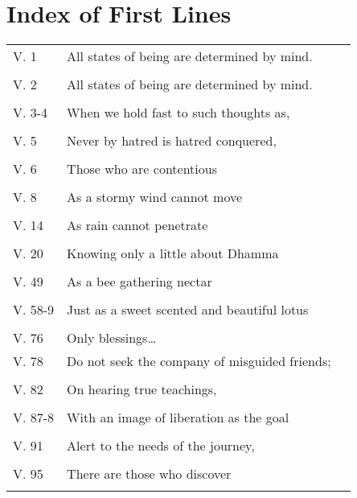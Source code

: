 
\chapter{Index of First Lines}

{\smaller
\setlength{\parskip}{0pt}
\setlength{\parindent}{0pt}

\begin{longtable}[c]{llr}
V. 1 & All states of being are determined by mind.\\ & \pageref{dhp-1}\\
V. 2 & All states of being are determined by mind.\\ & \pageref{dhp-2}\\
V. 3-4 & When we hold fast to such thoughts as,\\ & \pageref{dhp-3}\\
V. 5 & Never by hatred is hatred conquered,\\ & \pageref{dhp-5}\\
V. 6 & Those who are contentious\\ & \pageref{dhp-6}\\
V. 8 & As a stormy wind cannot move\\ & \pageref{dhp-8}\\
V. 14 & As rain cannot penetrate\\ & \pageref{dhp-14}\\
V. 20 & Knowing only a little about Dhamma\\ & \pageref{dhp-20}\\
V. 49 & As a bee gathering nectar\\ & \pageref{dhp-49}\\
V. 58-9 & Just as a sweet scented and beautiful lotus\\ & \pageref{dhp-58}\\
V. 76 & Only blessings\ldots & \pageref{dhp-76}\\
V. 78 & Do not seek the company of misguided friends;\\ & \pageref{dhp-78}\\
V. 82 & On hearing true teachings,\\ & \pageref{dhp-82}\\
V. 87-8 & With an image of liberation as the goal\\ & \pageref{dhp-87}\\
V. 91 & Alert to the needs of the journey,\\ & \pageref{dhp-91}\\
V. 95 & There are those who discover\\ & \pageref{dhp-95}\\

\end{longtable}}
